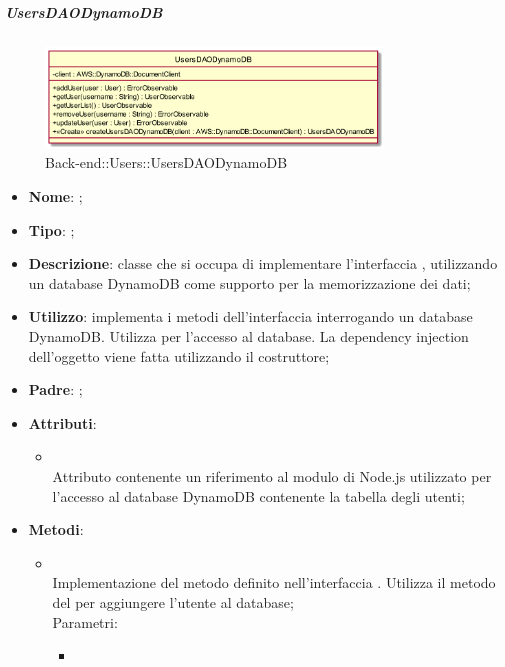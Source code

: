 \hypertarget{UsersDAODynamoDB_label}{\subparagraph{UsersDAODynamoDB}}
\begin{figure}[h]
	\centering
	\includegraphics[width=0.80\textwidth,height=\textheight,keepaspectratio]{images/ClassUsersDAODynamoDB.png}
	\caption{Back-end::Users::UsersDAODynamoDB}
\end{figure}
\begin{itemize}
	\item \textbf{Nome}: ;
	\item \textbf{Tipo}: ;
	\item \textbf{Descrizione}: classe che si occupa di implementare l'interfaccia , utilizzando un database DynamoDB come supporto per la memorizzazione dei dati;
	\item \textbf{Utilizzo}: implementa i metodi dell'interfaccia  interrogando un database DynamoDB. Utilizza  per l'accesso al database. La dependency injection dell'oggetto  viene fatta utilizzando il costruttore;
	\item \textbf{Padre}: ;
	\item \textbf{Attributi}:
	\begin{itemize}
		\item[]  \\
		Attributo contenente un riferimento al modulo di Node.js utilizzato per l'accesso al database DynamoDB contenente la tabella degli utenti;
	\end{itemize}
	\item \textbf{Metodi}:
	\begin{itemize}
		\item[]  \\		Implementazione del metodo definito nell'interfaccia . Utilizza il metodo  del  per aggiungere l'utente al database;\\
		Parametri:
		\begin{itemize}
			\item {} \\

\end{itemize}
\end{itemize}
\end{itemize}
